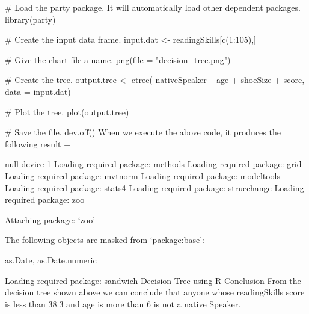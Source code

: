 # Load the party package. It will automatically load other dependent packages.
library(party)

# Create the input data frame.
input.dat <- readingSkills[c(1:105),]

# Give the chart file a name.
png(file = "decision_tree.png")

# Create the tree.
  output.tree <- ctree(
  nativeSpeaker ~ age + shoeSize + score, 
  data = input.dat)

# Plot the tree.
plot(output.tree)

# Save the file.
dev.off()
When we execute the above code, it produces the following result −

null device 
          1 
Loading required package: methods
Loading required package: grid
Loading required package: mvtnorm
Loading required package: modeltools
Loading required package: stats4
Loading required package: strucchange
Loading required package: zoo

Attaching package: ‘zoo’

The following objects are masked from ‘package:base’:

    as.Date, as.Date.numeric

Loading required package: sandwich
Decision Tree using R
Conclusion
From the decision tree shown above we can conclude that anyone whose readingSkills score is less than 38.3 and age is more than 6 is not a native Speaker.
